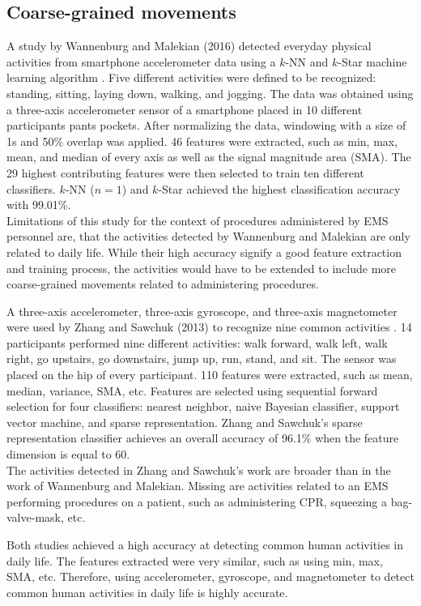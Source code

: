 \subsection{Coarse-grained movements}
A study by Wannenburg and Malekian (2016) detected everyday physical activities from smartphone accelerometer data using a $k$-NN and $k$-Star machine learning algorithm \cite{Wannenburg2016}. Five different activities were defined to be recognized: standing, sitting, laying down, walking, and jogging. The data was obtained using a three-axis accelerometer sensor of a smartphone placed in 10 different participants pants pockets. After normalizing the data, windowing with a size of 1s and 50\% overlap was applied. 46 features were extracted, such as min, max, mean, and median of every axis as well as the signal magnitude area (\gls{SMA}). The 29 highest contributing features were then selected to train ten different classifiers. $k$-NN ($n = 1$) and $k$-Star achieved the highest classification accuracy with 99.01\%.\\
Limitations of this study for the context of procedures administered by EMS personnel are, that the activities detected by Wannenburg and Malekian are only related to daily life. While their high accuracy signify a good feature extraction and training process, the activities would have to be extended to include more coarse-grained movements related to administering procedures.
\par A three-axis accelerometer, three-axis gyroscope, and three-axis magnetometer were used by Zhang and Sawchuk (2013) to recognize nine common activities \cite{Zhang2013}. 14 participants performed nine different activities: walk forward, walk left, walk right, go upstairs, go downstairs, jump up, run, stand, and sit. The sensor was placed on the hip of every participant. 110 features were extracted, such as mean, median, variance, SMA, etc. Features are selected using sequential forward selection for four classifiers: nearest neighbor, naive Bayesian classifier, support vector machine, and sparse representation. Zhang and Sawchuk's sparse representation classifier achieves an overall accuracy of 96.1\% when the feature dimension is equal to 60.\\
The activities detected in Zhang and Sawchuk's work are broader than in the work of Wannenburg and Malekian. Missing are activities related to an EMS performing procedures on a patient, such as administering CPR, squeezing a bag-valve-mask, etc.
\par Both studies achieved a high accuracy at detecting common human activities in daily life. The features extracted were very similar, such as using min, max, SMA, etc. Therefore, using accelerometer, gyroscope, and magnetometer to detect common human activities in daily life is highly accurate.
